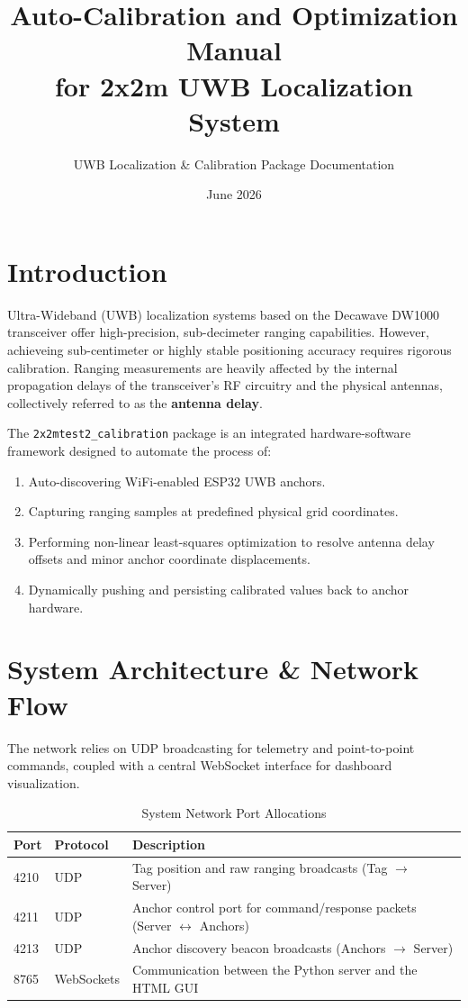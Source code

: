 \documentclass[11pt,a4paper]{article}
\title{\textbf{Auto-Calibration and Optimization Manual \\ for 2x2m UWB Localization System}}
\author{UWB Localization \& Calibration Package Documentation}
\date{June 2026}
\begin{document}
\maketitle
\tableofcontents
\newpage

\section{Introduction}
Ultra-Wideband (UWB) localization systems based on the Decawave DW1000 transceiver offer high-precision, sub-decimeter ranging capabilities. However, achieveing sub-centimeter or highly stable positioning accuracy requires rigorous calibration. Ranging measurements are heavily affected by the internal propagation delays of the transceiver's RF circuitry and the physical antennas, collectively referred to as the \textbf{antenna delay}.

The \texttt{2x2mtest2\_calibration} package is an integrated hardware-software framework designed to automate the process of:
\begin{enumerate}
    \item Auto-discovering WiFi-enabled ESP32 UWB anchors.
    \item Capturing ranging samples at predefined physical grid coordinates.
    \item Performing non-linear least-squares optimization to resolve antenna delay offsets and minor anchor coordinate displacements.
    \item Dynamically pushing and persisting calibrated values back to anchor hardware.
\end{enumerate}

\section{System Architecture \& Network Flow}
The network relies on UDP broadcasting for telemetry and point-to-point commands, coupled with a central WebSocket interface for dashboard visualization.

\begin{table}[h]
\centering
\caption{System Network Port Allocations}
\begin{tabular}{lll}
\toprule
\textbf{Port} & \textbf{Protocol} & \textbf{Description} \\ 
\midrule
4210 & UDP & Tag position and raw ranging broadcasts (Tag $\rightarrow$ Server) \\
4211 & UDP & Anchor control port for command/response packets (Server $\leftrightarrow$ Anchors) \\
4213 & UDP & Anchor discovery beacon broadcasts (Anchors $\rightarrow$ Server) \\
8765 & WebSockets & Communication between the Python server and the HTML GUI \\
\bottomrule
\end{tabular}
\end{table}
\end{document}
